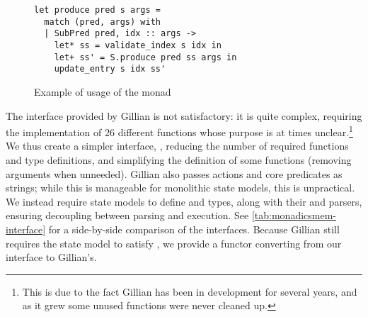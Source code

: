\begin{figure}
\begin{lstlisting}
let produce pred s args =
  match (pred, args) with
  | SubPred pred, idx :: args ->
    let* ss = validate_index s idx in
    let+ ss' = S.produce pred ss args in
    update_entry s idx ss'
\end{lstlisting}
\caption{Example of usage of the  monad}
\label{fig:example-delayed}
\end{figure}

The interface provided by Gillian is not satisfactory: it is quite complex, requiring the implementation of 26 different functions whose purpose is at times unclear.\footnote{This is due to the fact Gillian has been in development for several years, and as it grew some unused functions were never cleaned up.} We thus create a simpler interface, , reducing the number of required functions and type definitions, and simplifying the definition of some functions (removing arguments when unneeded). Gillian also passes actions and core predicates as strings; while this is manageable for monolithic state models, this is unpractical. We instead require state models to define  and  types, along with their  and  parsers, ensuring decoupling between parsing and execution. See \autoref{tab:monadicsmem-interface} for a side-by-side comparison of the interfaces. Because Gillian still requires the state model to satisfy , we provide a  functor converting from our interface to Gillian's.

